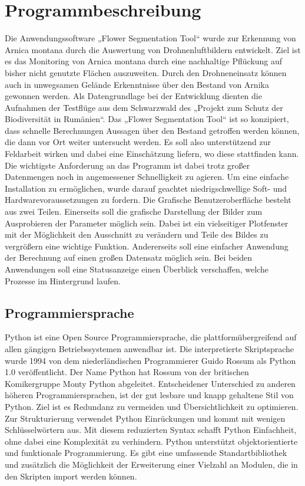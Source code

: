 \section{Programmbeschreibung}\label{programm}

Die Anwendungssoftware „Flower Segmentation Tool“ wurde zur Erkennung von Arnica montana durch die Auswertung von Drohnenluftbildern entwickelt. Ziel ist es das Monitoring von Arnica montana durch eine nachhaltige Pflückung auf bisher nicht genutzte Flächen auszuweiten. Durch den Drohneneinsatz können auch in unwegsamen Gelände Erkenntnisse über den Bestand von Arnika gewonnen werden. Als Datengrundlage bei der Entwicklung dienten die Aufnahmen der Testflüge aus dem Schwarzwald des „Projekt zum Schutz der Biodiversität in Rumänien“.
Das „Flower Segmentation Tool“ ist so konzipiert, dass schnelle Berechnungen Aussagen über den Bestand getroffen werden können, die dann vor Ort weiter untersucht werden. Es soll also unterstützend zur Feldarbeit wirken und dabei eine Einschätzung liefern, wo diese stattfinden kann. 
Die wichtigste Anforderung an das Programm ist dabei trotz großer Datenmengen noch in angemessener Schnelligkeit zu agieren. Um eine einfache Installation zu ermöglichen, wurde darauf geachtet niedrigschwellige Soft- und Hardwarevoraussetzungen zu fordern. 
Die Grafische Benutzeroberfläche besteht aus zwei Teilen. Einerseits soll die grafische Darstellung der Bilder zum Ausprobieren der Parameter möglich sein. Dabei ist ein vielseitiger Plotfenster mit der Möglichkeit den Ausschnitt zu verändern und Teile des Bildes zu vergrößern eine wichtige Funktion. Andererseits soll eine einfacher Anwendung der Berechnung auf einen großen Datensatz möglich sein. Bei beiden Anwendungen soll eine Statusanzeige einen Überblick verschaffen, welche Prozesse im Hintergrund laufen.

\subsection{Programmiersprache}
Python ist eine Open Source Programmiersprache, die plattformübergreifend auf allen gängigen Betriebssystemen anwendbar ist. Die interpretierte Skriptsprache wurde 1994 von dem niederländischen Programmierer Guido Rossum als Python 1.0 veröffentlicht. Der Name Python hat Rossum von der britischen Komikergruppe Monty Python abgeleitet.
Entscheidener Unterschied zu anderen höheren Programmiersprachen, ist der gut lesbare und knapp gehaltene Stil von Python. Ziel ist es Redundanz zu vermeiden und Übersichtlichkeit zu optimieren. Zur Strukturierung verwendet Python Einrückungen und kommt mit wenigen Schlüsselwörtern aus. Mit diesem reduzierten Syntax schafft Python Einfachheit, ohne dabei eine Komplexität zu verhindern. Python unterstützt objektorientierte und funktionale Programmierung. Es gibt eine umfassende  Standartbibliothek und zusätzlich die Möglichkeit der Erweiterung einer Vielzahl an Modulen, die in den Skripten import werden können.

